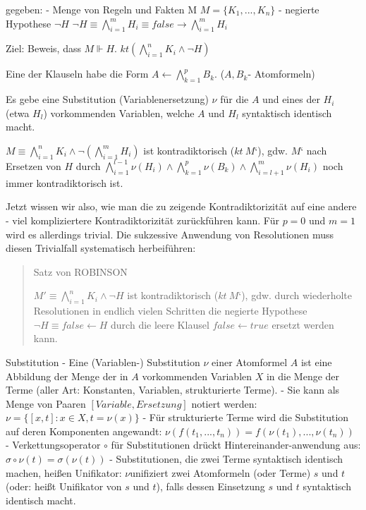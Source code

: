 \documentclass[a4paper]{article}
\begin{document}
\begin{multicols}{3}
  gegeben: - Menge von Regeln und Fakten M $M=\{K_1,...,K_n\}$ - negierte
  Hypothese $\lnot H$
  $\lnot H\equiv \bigwedge_{i=1}^m H_i \equiv false \rightarrow \bigwedge_{i=1}^m H_i$

  Ziel: Beweis, dass $M \Vdash H$.
  $kt(\bigwedge_{i=1}^n K_i \wedge \lnot H)$

  Eine der Klauseln habe die Form $A\leftarrow \bigwedge_{k=1}^p B_k$.
  ($A,B_k$- Atomformeln)

  Es gebe eine Substitution (Variablenersetzung) $\nu$ für die $A$ und
  eines der $H_i$ (etwa $H_l$) vorkommenden Variablen, welche $A$ und
  $H_l$ syntaktisch identisch macht.

  $M\equiv \bigwedge_{i=1}^n K_i\wedge \lnot(\bigwedge_{i=1}^m H_i)$ ist
  kontradiktorisch ($kt\ M‘$), gdw. $M‘$ nach Ersetzen von $H$ durch
  $\bigwedge_{i=1}^{l-1}\nu(H_i)\wedge\bigwedge_{k=1}^p\nu(B_k)\wedge\bigwedge_{i=l+1}^m \nu(H_i)$
  noch immer kontradiktorisch ist.

  Jetzt wissen wir also, wie man die zu zeigende Kontradiktorizität auf
  eine andere - viel kompliziertere Kontradiktorizität zurückführen kann.
  Für $p=0$ und $m=1$ wird es allerdings trivial. Die sukzessive Anwendung
  von Resolutionen muss diesen Trivialfall systematisch herbeiführen:

  \begin{quote}
    Satz von ROBINSON

    $M'\equiv\bigwedge_{i=1}^n K_i\wedge \lnot H$ ist kontradiktorisch
    ($kt\ M‘$), gdw. durch wiederholte Resolutionen in endlich vielen
    Schritten die negierte Hypothese $\lnot H\equiv false \leftarrow H$
    durch die leere Klausel $false\leftarrow true$ ersetzt werden kann.
  \end{quote}

  Substitution - Eine (Variablen-) Substitution $\nu$ einer Atomformel $A$
  ist eine Abbildung der Menge der in $A$ vorkommenden Variablen $X$ in
  die Menge der Terme (aller Art: Konstanten, Variablen, strukturierte
  Terme). - Sie kann als Menge von Paaren $[Variable,Ersetzung]$ notiert
  werden: $\nu=\{[x,t]: x\in X, t=\nu(x)\}$ - Für strukturierte Terme wird
  die Substitution auf deren Komponenten angewandt:
  $\nu(f(t_1,...,t_n)) = f(\nu(t_1),...,\nu(t_n))$ - Verkettungsoperator
  $\circ$ für Substitutionen drückt Hintereinander-anwendung aus:
  $\sigma\circ\nu(t)=\sigma(\nu(t))$ - Substitutionen, die zwei Terme
  syntaktisch identisch machen, heißen Unifikator: $\nu$unifiziert zwei
  Atomformeln (oder Terme) $s$ und $t$ (oder: heißt Unifikator von $s$ und
  $t$), falls dessen Einsetzung $s$ und $t$ syntaktisch identisch macht.


\end{multicols}
\end{document}

